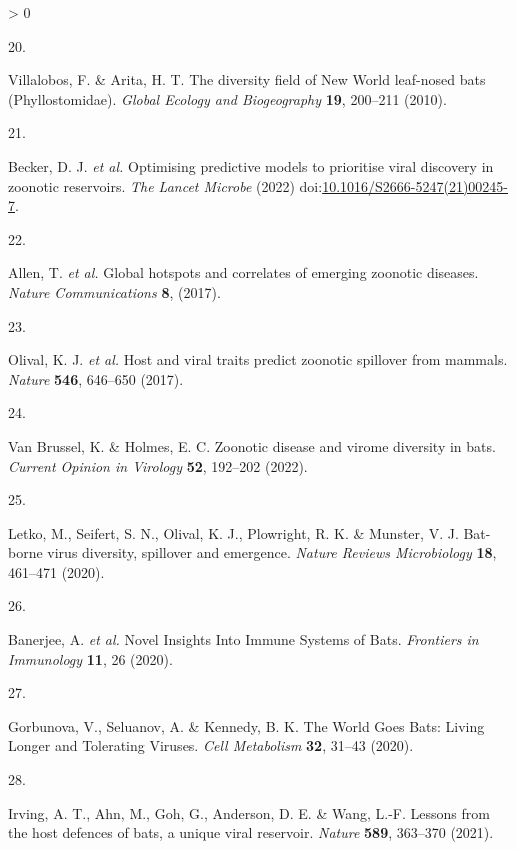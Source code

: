 \documentclass[10pt,oneside]{article}
\newlength{\cslhangindent}
\newlength{\csllabelwidth}
\newenvironment{CSLReferences}[3] %
 {%
  \setlength{\parindent}{0pt}
  \ifodd #1 \everypar{\setlength{\hangindent}{\cslhangindent}}\ignorespaces\fi
  \ifnum #2 > 0
  \setlength{\parskip}{#2\baselineskip}
  \fi
 }%
 {}
\newcommand{\CSLLeftMargin}[1]{\parbox[t]{\maxof{\widthof{#1}}{\csllabelwidth}}{#1}}
\newcommand{\CSLRightInline}[1]{\parbox[t]{\linewidth}{#1}}
\begin{document}
\begin{CSLReferences}{0}{0}
\leavevmode\hypertarget{ref-Villalobos2010DivFie}{}%
\CSLLeftMargin{20. }
\CSLRightInline{Villalobos, F. \& Arita, H. T. The diversity field of
New World leaf-nosed bats (Phyllostomidae). \emph{Global Ecology and
Biogeography} \textbf{19}, 200--211 (2010).}

\leavevmode\hypertarget{ref-Becker2022OptPre}{}%
\CSLLeftMargin{21. }
\CSLRightInline{Becker, D. J. \emph{et al.} Optimising predictive models
to prioritise viral discovery in zoonotic reservoirs. \emph{The Lancet
Microbe} (2022)
doi:\href{https://doi.org/10.1016/S2666-5247(21)00245-7}{10.1016/S2666-5247(21)00245-7}.}

\leavevmode\hypertarget{ref-Allen2017GloHot}{}%
\CSLLeftMargin{22. }
\CSLRightInline{Allen, T. \emph{et al.} Global hotspots and correlates
of emerging zoonotic diseases. \emph{Nature Communications} \textbf{8},
(2017).}

\leavevmode\hypertarget{ref-Olival2017HosVir}{}%
\CSLLeftMargin{23. }
\CSLRightInline{Olival, K. J. \emph{et al.} Host and viral traits
predict zoonotic spillover from mammals. \emph{Nature} \textbf{546},
646--650 (2017).}

\leavevmode\hypertarget{ref-VanBrussel2022ZooDis}{}%
\CSLLeftMargin{24. }
\CSLRightInline{Van Brussel, K. \& Holmes, E. C. Zoonotic disease and
virome diversity in bats. \emph{Current Opinion in Virology}
\textbf{52}, 192--202 (2022).}

\leavevmode\hypertarget{ref-Letko2020BatVir}{}%
\CSLLeftMargin{25. }
\CSLRightInline{Letko, M., Seifert, S. N., Olival, K. J., Plowright, R.
K. \& Munster, V. J. Bat-borne virus diversity, spillover and emergence.
\emph{Nature Reviews Microbiology} \textbf{18}, 461--471 (2020).}

\leavevmode\hypertarget{ref-Banerjee2020NovIns}{}%
\CSLLeftMargin{26. }
\CSLRightInline{Banerjee, A. \emph{et al.} Novel Insights Into Immune
Systems of Bats. \emph{Frontiers in Immunology} \textbf{11}, 26 (2020).}

\leavevmode\hypertarget{ref-Gorbunova2020WorGoe}{}%
\CSLLeftMargin{27. }
\CSLRightInline{Gorbunova, V., Seluanov, A. \& Kennedy, B. K. The World
Goes Bats: Living Longer and Tolerating Viruses. \emph{Cell Metabolism}
\textbf{32}, 31--43 (2020).}

\leavevmode\hypertarget{ref-Irving2021LesHos}{}%
\CSLLeftMargin{28. }
\CSLRightInline{Irving, A. T., Ahn, M., Goh, G., Anderson, D. E. \&
Wang, L.-F. Lessons from the host defences of bats, a unique viral
reservoir. \emph{Nature} \textbf{589}, 363--370 (2021).}


\end{CSLReferences}
\end{document}

